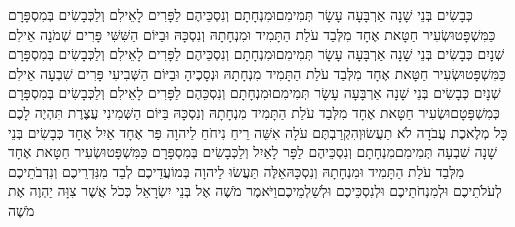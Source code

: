\documentclass[../main/main.tex]{subfiles}
\begin{document}
\begin{multicols*}{\ncols}
כְּבָשִׂים בְּנֵי שָׁנָה אַרְבָּעָה עָשָׂר תְּמִימִם\PreVerseSpace{}וּמִנְחָתָם וְנִסְכֵּיהֶם לַפָּרִים לָאֵילִם וְלַכְּבָשִׂים בְּמִסְפָּרָם כַּמִּשְׁפָּט\PreVerseSpace{}וּשְׂעִיר חַטָּאת אֶחָד מִלְּבַד עֹלַת הַתָּמִיד וּמִנְחָתָהּ וְנִסְכָּהּ \ClosedSection{}וּבַיּוֹם הַשִּׁשִּׁי פָּרִים שְׁמֹנָה אֵילִם שְׁנָיִם כְּבָשִׂים בְּנֵי שָׁנָה אַרְבָּעָה עָשָׂר תְּמִימִם\PreVerseSpace{}וּמִנְחָתָם וְנִסְכֵּיהֶם לַפָּרִים לָאֵילִם וְלַכְּבָשִׂים בְּמִסְפָּרָם כַּמִּשְׁפָּט\PreVerseSpace{}וּשְׂעִיר חַטָּאת אֶחָד מִלְּבַד עֹלַת הַתָּמִיד מִנְחָתָהּ וּנְסָכֶיהָ \ClosedSection{}וּבַיּוֹם הַשְּׁבִיעִי פָּרִים שִׁבְעָה אֵילִם שְׁנָיִם כְּבָשִׂים בְּנֵי שָׁנָה אַרְבָּעָה עָשָׂר תְּמִימִם\PreVerseSpace{}וּמִנְחָתָם וְנִסְכֵּהֶם לַפָּרִים לָאֵילִם וְלַכְּבָשִׂים בְּמִסְפָּרָם כְּמִשְׁפָּטָם\PreVerseSpace{}וּשְׂעִיר חַטָּאת אֶחָד מִלְּבַד עֹלַת הַתָּמִיד מִנְחָתָהּ וְנִסְכָּהּ \ClosedSection{}בַּיּוֹם הַשְּׁמִינִי עֲצֶרֶת תִּהְיֶה לָכֶם כָּל מְלֶאכֶת עֲבֹדָה לֹא תַעֲשׂוּ\PreVerseSpace{}וְהִקְרַבְתֶּם עֹלָה אִשֵּׁה רֵיחַ נִיחֹחַ לַיהוָה פַּר אֶחָד אַיִל אֶחָד כְּבָשִׂים בְּנֵי שָׁנָה שִׁבְעָה תְּמִימִם\PreVerseSpace{}מִנְחָתָם וְנִסְכֵּיהֶם לַפָּר לָאַיִל וְלַכְּבָשִׂים בְּמִסְפָּרָם כַּמִּשְׁפָּט\PreVerseSpace{}וּשְׂעִיר חַטָּאת אֶחָד מִלְּבַד עֹלַת הַתָּמִיד וּמִנְחָתָהּ וְנִסְכָּהּ\PreVerseSpace{}אֵלֶּה תַּעֲשׂוּ לַיהוָה בְּמוֹעֲדֵיכֶם לְבַד מִנִּדְרֵיכֶם וְנִדְבֹתֵיכֶם לְעֹלֹתֵיכֶם וּלְמִנְחֹתֵיכֶם וּלְנִסְכֵּיכֶם וּלְשַׁלְמֵיכֶם\PreChapterSpace{}וַיֹּאמֶר מֹשֶׁה אֶל בְּנֵי יִשְׂרָאֵל כְּכֹל אֲשֶׁר צִוָּה יַהְוֶה אֶת מֹשֶׁה\OpenSection{}\par

\end{multicols*}
\end{document}
